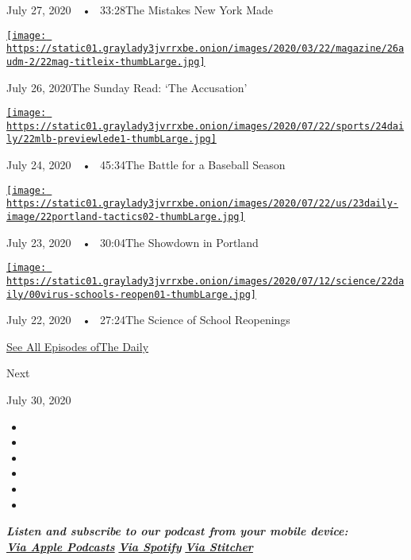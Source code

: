 July 27, 2020~~•~ 33:28The Mistakes New York Made

\href{https://www.nytimes3xbfgragh.onion/2020/07/26/podcasts/the-daily/the-accusation-the-sunday-read.html?action=click\&module=audio-series-bar\&region=header\&pgtype=Article}{\texttt{[image: https://static01.graylady3jvrrxbe.onion/images/2020/03/22/magazine/26audm-2/22mag-titleix-thumbLarge.jpg]}}

July 26, 2020The Sunday Read: `The Accusation'

\href{https://www.nytimes3xbfgragh.onion/2020/07/24/podcasts/the-daily/mlb-baseball-season-coronavirus.html?action=click\&module=audio-series-bar\&region=header\&pgtype=Article}{\texttt{[image: https://static01.graylady3jvrrxbe.onion/images/2020/07/22/sports/24daily/22mlb-previewlede1-thumbLarge.jpg]}}

July 24, 2020~~•~ 45:34The Battle for a Baseball Season

\href{https://www.nytimes3xbfgragh.onion/2020/07/23/podcasts/the-daily/portland-protests.html?action=click\&module=audio-series-bar\&region=header\&pgtype=Article}{\texttt{[image: https://static01.graylady3jvrrxbe.onion/images/2020/07/22/us/23daily-image/22portland-tactics02-thumbLarge.jpg]}}

July 23, 2020~~•~ 30:04The Showdown in Portland

\href{https://www.nytimes3xbfgragh.onion/2020/07/22/podcasts/the-daily/school-reopenings-coronavirus.html?action=click\&module=audio-series-bar\&region=header\&pgtype=Article}{\texttt{[image: https://static01.graylady3jvrrxbe.onion/images/2020/07/12/science/22daily/00virus-schools-reopen01-thumbLarge.jpg]}}

July 22, 2020~~•~ 27:24The Science of School Reopenings

\href{https://www.nytimes3xbfgragh.onion/column/the-daily}{See All
Episodes ofThe Daily}

Next

July 30, 2020

\begin{itemize}
\item
\item
\item
\item
\item
\item
\end{itemize}

\emph{\textbf{Listen and subscribe to our podcast from your mobile
device:}}\\
\textbf{\href{https://itunes.apple.com/us/podcast/the-daily/id1200361736?mt=2}{\emph{Via
Apple Podcasts}}} \emph{\textbf{\textbar{}}}
\textbf{\href{https://open.spotify.com/show/3IM0lmZxpFAY7CwMuv9H4g?si=SfuMSC55R1qprFsRZU3_zw}{\emph{Via
Spotify}}} \emph{\textbf{\textbar{}}}
\textbf{\href{http://www.stitcher.com/podcast/the-new-york-times/the-daily-10}{\emph{Via
Stitcher}}}

